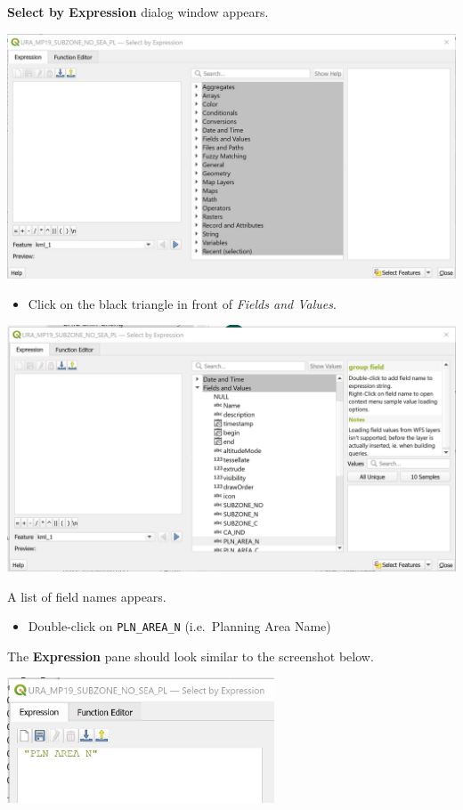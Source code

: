 \documentclass[
  letterpaper,
  DIV=11,
  numbers=noendperiod]{scrreprt}
\providecommand{\tightlist}{%
  \setlength{\itemsep}{0pt}\setlength{\parskip}{0pt}}\usepackage{longtable,booktabs,array}
\begin{document}
\textbf{Select by Expression} dialog window appears.

\includegraphics{./img04/image4.jpg}

\begin{itemize}
\tightlist
\item
  Click on the black triangle in front of \emph{Fields and Values}.
\end{itemize}

\includegraphics{./img04/image5.jpg}

A list of field names appears.

\begin{itemize}
\tightlist
\item
  Double-click on \texttt{PLN\_AREA\_N} (i.e.~Planning Area Name)
\end{itemize}

The \textbf{Expression} pane should look similar to the screenshot
below.

\includegraphics[width=3.125in,height=\textheight]{./img04/image6.jpg}
\end{document}
